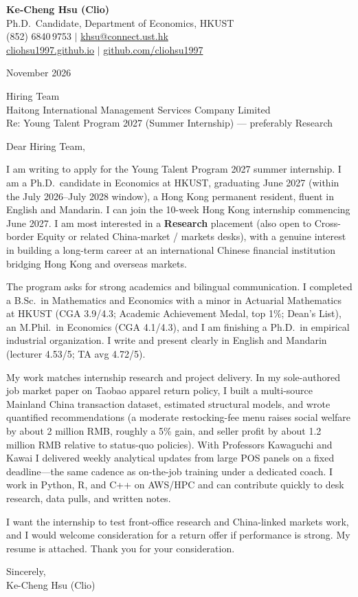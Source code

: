 \documentclass[11pt,letterpaper]{article}
\begin{document}
\noindent
{\bfseries Ke-Cheng Hsu (Clio)}\\
Ph.D.\ Candidate, Department of Economics, HKUST\\
(852) 6840\,9753 \quad $|$ \quad \href{mailto:khsu@connect.ust.hk}{khsu@connect.ust.hk}\\
\href{https://cliohsu1997.github.io/}{cliohsu1997.github.io} \quad $|$ \quad \href{https://github.com/cliohsu1997}{github.com/cliohsu1997}

\vspace{0.3em}
 November 2026

\vspace{0.2em}
\noindent
Hiring Team\\
Haitong International Management Services Company Limited\\
Re: Young Talent Program 2027 (Summer Internship) --- preferably Research

\vspace{0.1em}
Dear Hiring Team,

I am writing to apply for the Young Talent Program 2027 summer internship. I am a Ph.D.\ candidate in Economics at HKUST, graduating June 2027 (within the July 2026--July 2028 window), a Hong Kong permanent resident, fluent in English and Mandarin. I can join the 10-week Hong Kong internship commencing June 2027. I am most interested in a \textbf{Research} placement (also open to Cross-border Equity or related China-market / markets desks), with a genuine interest in building a long-term career at an international Chinese financial institution bridging Hong Kong and overseas markets.

The program asks for strong academics and bilingual communication. I completed a B.Sc.\ in Mathematics and Economics with a minor in Actuarial Mathematics at HKUST (CGA 3.9/4.3; Academic Achievement Medal, top 1\%; Dean's List), an M.Phil.\ in Economics (CGA 4.1/4.3), and I am finishing a Ph.D.\ in empirical industrial organization. I write and present clearly in English and Mandarin (lecturer 4.53/5; TA avg 4.72/5).

My work matches internship research and project delivery. In my sole-authored job market paper on Taobao apparel return policy, I built a multi-source Mainland China transaction dataset, estimated structural models, and wrote quantified recommendations (a moderate restocking-fee menu raises social welfare by about 2 million RMB, roughly a 5\% gain, and seller profit by about 1.2 million RMB relative to status-quo policies). With Professors Kawaguchi and Kawai I delivered weekly analytical updates from large POS panels on a fixed deadline---the same cadence as on-the-job training under a dedicated coach. I work in Python, R, and C++ on AWS/HPC and can contribute quickly to desk research, data pulls, and written notes.

I want the internship to test front-office research and China-linked markets work, and I would welcome consideration for a return offer if performance is strong. My resume is attached. Thank you for your consideration.

\vspace{0.3em}
Sincerely,\\[0.25em]
Ke-Cheng Hsu (Clio)
\end{document}
